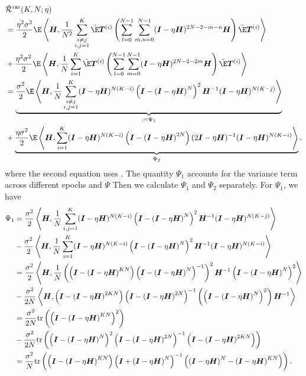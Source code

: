 \begin{align*}
    &\Tilde{\cR}^{\var}(K,N;\eta)\\ 
    &=\frac{\eta^2\sigma^2}{2}\E\inp{\mH}{\frac{1}{N^2}\sum_{\substack{i\neq j \\i,j=1}}^K\fakeE\mT^{(i)}\left(\sum_{l=0}^{N-1}\sum_{m,n=0}^{N-1}(\mI-\eta \mH)^{2N-2-m-n}\mH\right)\fakeE\mT^{(i)}} \\
    &+\frac{\eta^2\sigma^2}{2}\E\inp{\mH}{\frac{1}{N}\sum_{i=1}^K\fakeE\mT^{(i)}\left(\sum_{l=0}^{N-1}\sum_{m=0}^{N-1}(\mI-\eta \mH)^{2N-2-2m}\mH\right)\fakeE\mT^{(i)}} \\
    &=\underbrace{\frac{\sigma^2}{2}\E\inp{\mH}{\frac{1}{N}\sum_{\substack{i\neq j \\i,j=1}}^K(\mI-\eta\mH)^{N(K-i)}\left(\mI-\left(\mI-\eta \mH\right)^N\right)^2\mH^{-1}(\mI-\eta\mH)^{N(K-j)}}}_{:=\Psi_1} \\
    &+\underbrace{\frac{\eta\sigma^2}{2}\E\inp{\mH}{\sum_{i=1}^K(\mI-\eta\mH)^{N(K-i)}\left(\mI-\left(\mI-\eta\mH\right)^{2N}\right)(2\mI-\eta\mH)^{-1}(\mI-\eta\mH)^{N(K-i)}}}_{\Psi_2}.
\end{align*}
where the second equation uses . The quantity $\Psi_1$ accounts for the variance term across different epochs and $\Psi$ Then we calculate $\Psi_1$ and $\Psi_2$ separately. For $\Psi_1$, we have
\begin{align*}
    \Psi_1 &=\frac{\sigma^2}{2}\left\langle {\bm{H}},\frac{1}{N}\sum_{\substack{i,j=1}}^K({\bm{I}}-\eta{\bm{H}})^{N(K-i)}\left({\bm{I}}-\left({\bm{I}}-\eta {\bm{H}}\right)^N\right)^2{\bm{H}}^{-1}({\bm{I}}-\eta{\bm{H}})^{N(K-j)}\right\rangle \\
    &-\frac{\sigma^2}{2}\left\langle {\bm{H}},\frac{1}{N}\sum_{\substack{i=1}}^K({\bm{I}}-\eta{\bm{H}})^{N(K-i)}\left({\bm{I}}-\left({\bm{I}}-\eta {\bm{H}}\right)^N\right)^2{\bm{H}}^{-1}({\bm{I}}-\eta{\bm{H}})^{N(K-i)}\right\rangle \\
    &=\frac{\sigma^2}{2}\left\langle {\bm{H}},\frac{1}{N}\left(\left({\bm{I}}-\left({\bm{I}}-\eta {\bm{H}}\right)^{KN}\right)\left({\bm{I}}-\left({\bm{I}}-\eta {\bm{H}}\right)^{N}\right)^{-1}\right)^2{\bm{H}}^{-1}\left({\bm{I}}-\left({\bm{I}}-\eta {\bm{H}}\right)^N\right)^2\right\rangle \\
    &-\frac{\sigma^2}{2N}\left\langle {\bm{H}},\left({\bm{I}}-\left({\bm{I}}-\eta{\bm{H}}\right)^{2KN}\right)\left({\bm{I}}-\left({\bm{I}}-\eta{\bm{H}}\right)^{2N}\right)^{-1}\left(\left({\bm{I}}-\left({\bm{I}}-\eta{\bm{H}}\right)^{N}\right)^2\right){\bm{H}}^{-1}\right\rangle \\
    &=\frac{\sigma^2}{2N}\mathrm{tr}\left(\left({\bm{I}}-\left({\bm{I}}-\eta{\bm{H}}\right)^{KN}\right)^2\right)\\
    &-\frac{\sigma^2}{2N}\mathrm{tr}\left(\left({\bm{I}}-\left({\bm{I}}-\eta{\bm{H}}\right)^{N}\right)^2\left({\bm{I}}-\left({\bm{I}}-\eta{\bm{H}}\right)^{2N}\right)^{-1}\left({\bm{I}}-\left({\bm{I}}-\eta{\bm{H}}\right)^{2KN}\right)\right) \\
    &=\frac{\sigma^2}{N}\mathrm{tr}\left(\left({\bm{I}}-\left({\bm{I}}-\eta{\bm{H}}\right)^{KN}\right)\left({\bm{I}}+\left({\bm{I}}-\eta{\bm{H}}\right)^{N}\right)^{-1}\left(\left({\bm{I}}-\eta{\bm{H}}\right)^{N}-\left({\bm{I}}-\eta{\bm{H}}\right)^{KN}\right)\right).
\end{align*}
